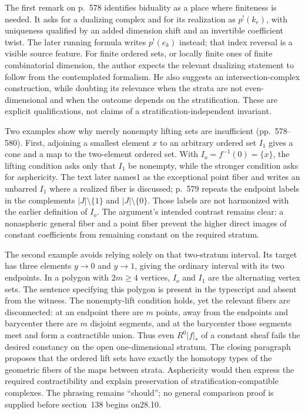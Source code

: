 The first remark on p.~578 identifies biduality as a place where finiteness is needed. It asks for a dualizing complex and for its realization as $p^!(k_e)$, with uniqueness qualified by an added dimension shift and an invertible coefficient twist. The later running formula writes $p^!(e_k)$ instead; that index reversal is a visible source feature. For finite ordered sets, or locally finite ones of finite combinatorial dimension, the author expects the relevant dualizing statement to follow from the contemplated formalism. He also suggests an intersection-complex construction, while doubting its relevance when the strata are not even-dimensional and when the outcome depends on the stratification. These are explicit qualifications, not claims of a stratification-independent invariant.

Two examples show why merely nonempty lifting sets are insufficient (pp.~578--580). First, adjoining a smallest element $x$ to an arbitrary ordered set $I_1$ gives a cone and a map to the two-element ordered set. With $I_o=f^{-1}(0)=\{x\}$, the lifting condition asks only that $I_1$ be nonempty, while the stronger condition asks for asphericity. The text later names1 as the exceptional point fiber and writes an unbarred $I_1$ where a realized fiber is discussed; p.~579 repeats the endpoint labels in the complements $|J|\setminus\{1\}$ and $|J|\setminus\{0\}$. Those labels are not harmonized with the earlier definition of $I_o$. The argument's intended contrast remains clear: a nonaspheric general fiber and a point fiber prevent the higher direct images of constant coefficients from remaining constant on the required stratum.

The second example avoids relying solely on that two-stratum interval. Its target has three elements $y\to0$ and $y\to1$, giving the ordinary interval with its two endpoints. In a polygon with $2m\geq4$ vertices, $I_o$ and $I_1$ are the alternating vertex sets. The sentence specifying this polygon is present in the typescript and absent from the witness. The nonempty-lift condition holds, yet the relevant fibers are disconnected: at an endpoint there are $m$ points, away from the endpoints and barycenter there are $m$ disjoint segments, and at the barycenter those segments meet and form a contractible union. Thus even $R^0|f|_*$ of a constant sheaf fails the desired constancy on the open one-dimensional stratum. The closing paragraph proposes that the ordered lift sets have exactly the homotopy types of the geometric fibers of the maps between strata. Asphericity would then express the required contractibility and explain preservation of stratification-compatible complexes. The phrasing remains ``should''; no general comparison proof is supplied before section~138 begins on28.10.
